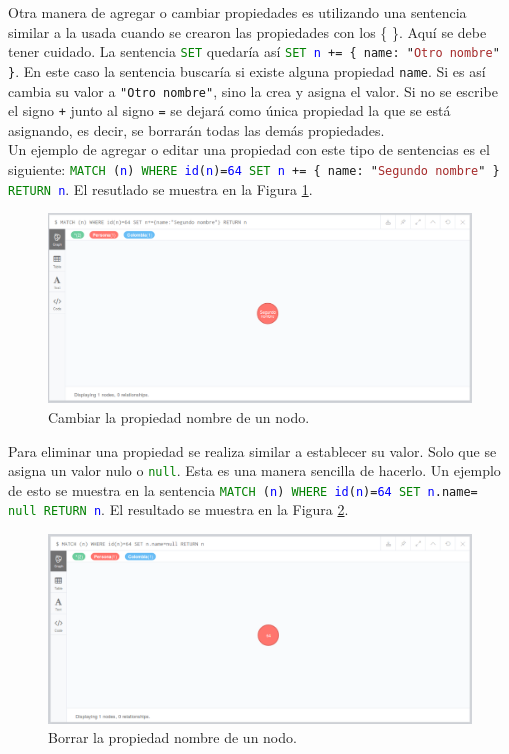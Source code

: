 \documentclass[conference]{IEEEtran}
\begin{document}
Otra manera de agregar o cambiar propiedades es utilizando una sentencia similar a la usada cuando se crearon las propiedades con los \{ \}. Aquí se debe tener cuidado. La sentencia \texttt{\textcolor{green}{SET}} quedaría así \texttt{\textcolor{green}{SET} \textcolor{blue}{n} += \{ name: "\textcolor{brown}{Otro nombre}" \}}. En este caso la sentencia buscaría si existe alguna propiedad \texttt{name}. Si es así cambia su valor a \texttt{"Otro nombre"}, sino la crea y asigna el valor. Si no se escribe el signo \texttt{+} junto al signo \texttt{=} se dejará como única propiedad la que se está asignando, es decir, se borrarán todas las demás propiedades. 
\\
Un ejemplo de agregar o editar una propiedad con este tipo de sentencias es el siguiente: \texttt{\textcolor{green}{MATCH} (\textcolor{blue}{n}) \textcolor{green}{WHERE} \textcolor{blue}{id}(\textcolor{blue}{n})=\textcolor{blue}{64} \textcolor{green}{SET} \textcolor{blue}{n} += \{ name: "\textcolor{brown}{Segundo nombre}" \}  \textcolor{green}{RETURN} \textcolor{blue}{n}}. El resutlado se muestra en la Figura \ref{fig29}.

\begin{figure}[H]
\begin{center}
\includegraphics[width= 0.45 \textwidth]{set_nombre2.png}
\end{center}
\caption{Cambiar la propiedad nombre de un nodo.}
\label{fig29}
\end{figure}

Para eliminar una propiedad se realiza similar a establecer su valor. Solo que se asigna un valor nulo o \texttt{\textcolor{green}{null}}. Esta es una manera sencilla de hacerlo. Un ejemplo de esto se muestra en la sentencia \texttt{\textcolor{green}{MATCH} (\textcolor{blue}{n}) \textcolor{green}{WHERE} \textcolor{blue}{id}(\textcolor{blue}{n})=\textcolor{blue}{64} \textcolor{green}{SET} \textcolor{blue}{n}.name= \textcolor{green}{null}  \textcolor{green}{RETURN} \textcolor{blue}{n}}. El resultado se muestra en la Figura \ref{fig30}.

\begin{figure}[H]
\begin{center}
\includegraphics[width= 0.45 \textwidth]{set_nombre3.png}
\end{center}
\caption{Borrar la propiedad nombre de un nodo.}
\label{fig30}
\end{figure}
\end{document}
